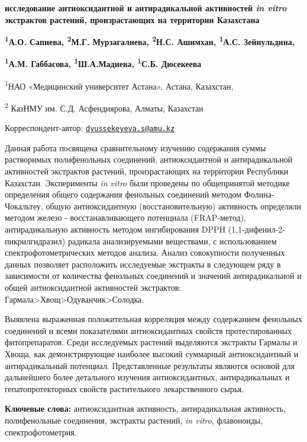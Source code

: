 
{\bfseries исследование антиоксидантной и антирадикальной активностей
\emph{in vitro} экстрактов растений, произрастающих на территории
Казахстана}

{\bfseries \textsuperscript{1}А.О. Сапиева, \textsuperscript{2}М.Г.
Мурзагалиева, \textsuperscript{2}Н.С. Ашимхан, \textsuperscript{1}А.С.
Зейнульдина,}

{\bfseries \textsuperscript{1}А.М. Габбасова,
\textsuperscript{1}Ш.А.Мадиева, \textsuperscript{1}С.Б.
Дюсекеева}\textsuperscript{\envelope }

\textsuperscript{1}НАО «Медицинский университет Астана», Астана,
Казахстан,

\textsuperscript{2} КазНМУ им. С.Д. Асфендиярова, Алматы, Казахстан

\textsuperscript{\envelope }Корреспондент-автор:
\href{mailto:dyussekeyeva.s@amu.kz}{\nolinkurl{dyussekeyeva.s@amu.kz}}

Данная работа посвящена сравнительному изучению содержания суммы
растворимых полифенольных соединений, антиоксидантной и антирадикальной
активностей экстрактов растений, произрастающих на территории Республики
Казахстан. Эксперименты \emph{in vitro} были проведены по общепринятой
методике определения общего содержания фенольных соединений методом
Фолина-Чокальтеу, общую антиоксидантную (восстановительную) активность
определяли методом железо - восстанавливающего потенциала (FRAP-метод),
антирадикальную активность методом ингибирования DPPH
(1,1-дифенил-2-пикрилгидразил) радикала анализируемыми веществами, с
использованием спектрофотометрических методов анализа. Анализ
совокупности полученных данных позволяет расположить исследуемые
экстракты в следующем ряду в зависимости от количества фенольных
соединений и значений антирадикальной и общей антиоксидантной
активностей экстрактов:
Гармала\textgreater Хвощ\textgreater Одуванчик\textgreater Солодка.

Выявлена выраженная положительная корреляция между содержанием фенольных
соединений и всеми показателями антиоксидантных свойств протестированных
фитопрепаратов. Среди исследуемых растений выделяются экстракты Гармалы
и Хвоща, как демонстрирующие наиболее высокий суммарный антиоксидантный
и антирадикальный потенциал. Представленные результаты являются основой
для дальнейшего более детального изучения антиоксидантных,
антирадикальных и гепатопротекторных свойств растительного
лекарственного сырья.

{\bfseries Ключевые слова:} антиоксидантная активность, антирадикальная
активность, полифенольные соединения, экстракты растений, \emph{in
vitro}, флавоноиды, спектрофотометрия.


